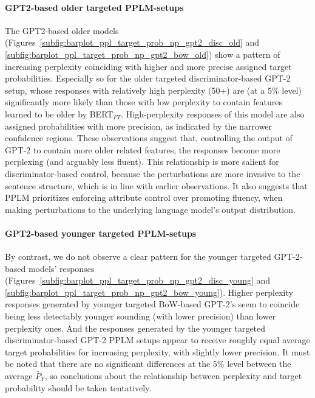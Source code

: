 \paragraph{GPT2-based older targeted PPLM-setups} The GPT2-based older models (Figures~\ref{subfig:barplot_ppl_target_prob_np_gpt2_disc_old} and \ref{subfig:barplot_ppl_target_prob_np_gpt2_bow_old}) show a pattern of increasing perplexity coinciding with higher and more precise assigned target probabilities. Especially so for the older targeted discriminator-based GPT-2 setup, whose responses with relatively high perplexity (50+) are (at a 5\% level) significantly more likely than those with low perplexity to contain features learned to be older by BERT$_{FT}$. High-perplexity responses of this model are also assigned probabilities with more precision, as indicated by the narrower confidence regions. These observations suggest that, controlling the output of GPT-2 to contain more older related features, the responses become more perplexing (and arguably less fluent). This relationship is more salient for discriminator-based control, because the perturbations are more invasive to the sentence structure, which is in line with earlier observations. It also suggests that PPLM prioritizes enforcing attribute control over promoting fluency, when making perturbations to the underlying language model's output distribution.  
\paragraph{GPT2-based younger targeted PPLM-setups} By contrast, we do not observe a clear pattern for the younger targeted GPT-2-based models' responses (Figures~\ref{subfig:barplot_ppl_target_prob_np_gpt2_disc_young} and \ref{subfig:barplot_ppl_target_prob_np_gpt2_bow_young}). Higher perplexity responses generated by younger targeted BoW-based GPT-2's seem to coincide being less detectably younger sounding (with lower precision) than lower perplexity ones. And the responses generated by the younger targeted discriminator-based GPT-2 PPLM setups appear to receive roughly equal average target probabilities for increasing perplexity, with slightly lower precision. It must be noted that there are no significant differences at the 5\% level between the average $\bar{P}_Y$, so conclusions about the relationship between perplexity and target probability should be taken tentatively.

